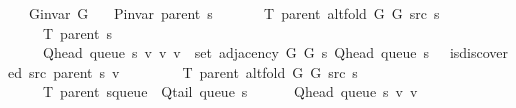 \begin{isabellebody}
\ \ \ {\isachardoublequoteopen}G{\isachardot}{\kern0pt}invar\ G{}{\isachardoublequoteclose}\isanewline
\ \ \ {\isachardoublequoteopen}P{\isacharunderscore}{\kern0pt}invar\ {\isacharparenleft}{\kern0pt}parent\ s{\isacharparenright}{\kern0pt}{\isachardoublequoteclose}\isanewline
\ \ \isanewline
\ \ \ \ {\isachardoublequoteopen}T\ {\isacharparenleft}{\kern0pt}parent\ {\isacharparenleft}{\kern0pt}alt{\isacharunderscore}{\kern0pt}fold\ G{}\ G{}\ src\ s{\isacharparenright}{\kern0pt}{\isacharparenright}{\kern0pt}\ {\isacharequal}{\kern0pt}\isanewline
\ \ \ \ \ T\ {\isacharparenleft}{\kern0pt}parent\ s{\isacharparenright}{\kern0pt}\ {\isasymunion}\isanewline
\ \ \ \ \ {\isacharbraceleft}{\kern0pt}{\isacharparenleft}{\kern0pt}Q{\isacharunderscore}{\kern0pt}head\ {\isacharparenleft}{\kern0pt}queue\ s{\isacharparenright}{\kern0pt}{\isacharcomma}{\kern0pt}\ v{\isacharparenright}{\kern0pt}\ {\isacharbar}{\kern0pt}v{\isachardot}{\kern0pt}\ v\ {\isasymin}\ set\ {\isacharparenleft}{\kern0pt}adjacency\ G{}\ G{}\ s\ {\isacharparenleft}{\kern0pt}Q{\isacharunderscore}{\kern0pt}head\ {\isacharparenleft}{\kern0pt}queue\ s{\isacharparenright}{\kern0pt}{\isacharparenright}{\kern0pt}{\isacharparenright}{\kern0pt}\ {\isasymand}\ {\isasymnot}\ is{\isacharunderscore}{\kern0pt}discovered\ src\ {\isacharparenleft}{\kern0pt}parent\ s{\isacharparenright}{\kern0pt}\ v{\isacharbraceright}{\kern0pt}{\isachardoublequoteclose}\isanewline
%
\isadelimproof
%
\endisadelimproof
%
\isatagproof
{}\isamarkupfalse%
\ {\isacharminus}{\kern0pt}\isanewline
\ \ \isamarkupfalse%
\isanewline
\ \ \ \ {\isachardoublequoteopen}T\ {\isacharparenleft}{\kern0pt}parent\ {\isacharparenleft}{\kern0pt}alt{\isacharunderscore}{\kern0pt}fold\ G{}\ G{}\ src\ s{\isacharparenright}{\kern0pt}{\isacharparenright}{\kern0pt}\ {\isacharequal}{\kern0pt}\isanewline
\ \ \ \ \ T\ {\isacharparenleft}{\kern0pt}parent\ {\isacharparenleft}{\kern0pt}s{\isasymlparr}queue\ {\isacharcolon}{\kern0pt}{\isacharequal}{\kern0pt}\ Q{\isacharunderscore}{\kern0pt}tail\ {\isacharparenleft}{\kern0pt}queue\ s{\isacharparenright}{\kern0pt}{\isasymrparr}{\isacharparenright}{\kern0pt}{\isacharparenright}{\kern0pt}\ {\isasymunion}\isanewline
\ \ \ \ \ {\isacharbraceleft}{\kern0pt}{\isacharparenleft}{\kern0pt}Q{\isacharunderscore}{\kern0pt}head\ {\isacharparenleft}{\kern0pt}queue\ s{\isacharparenright}{\kern0pt}{\isacharcomma}{\kern0pt}\ v{\isacharparenright}{\kern0pt}\ {\isacharbar}{\kern0pt}v{\isachardot}{\kern0pt}\isanewline

\end{isabellebody}
